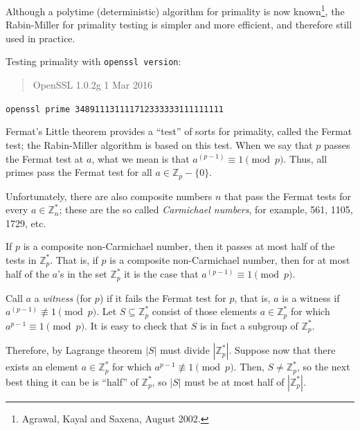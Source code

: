 \begin{frame}
Although a polytime (deterministic) algorithm for primality is now
known\footnote{Agrawal, Kayal and Saxena, August 2002.}, the
Rabin-Miller  
for primality testing is simpler and
more efficient, and therefore still used in practice.
\end{frame}

\begin{frame}
Testing primality with {\tt openssl version}: 
\begin{quote}
OpenSSL 1.0.2g  1 Mar 2016
\end{quote}

{\tt openssl prime 348911131111712333333111111111}
\end{frame}

\begin{frame}
Fermat's Little theorem
provides a ``test'' of sorts for primality,
called the Fermat test; the Rabin-Miller algorithm
is based on this test.  When we say
that $p$ passes the Fermat test at $a$, what we mean is that
$a^{(p-1)}\equiv 1\pmod p$.  Thus, all primes pass the Fermat test for
all $a\in\mathbb{Z}_p-\{0\}$.  

Unfortunately, there are also composite numbers $n$ that pass the
Fermat tests for every $a\in\mathbb{Z}_n^*$; these are the so called
{\em Carmichael numbers}, for example, 561, 1105, 1729, etc.
\end{frame}

\begin{frame}
If $p$ is a composite non-Carmichael number, then it passes at most
half of the tests in $\mathbb{Z}_p^*$.  That is, if $p$ is a composite
non-Carmichael number, then for at most half of the $a$'s in the set
$\mathbb{Z}_p^*$ it is the case that $a^{(p-1)}\equiv 1\pmod p$.

Call $a$ a {\em witness} (for $p$) if it fails the Fermat test for
$p$, that is, $a$ is a witness if $a^{(p-1)}\not\equiv 1\pmod p$.  Let
$S\subseteq\mathbb{Z}_p^*$ consist of those elements
$a\in\mathbb{Z}_p^*$ for which $a^{p-1}\equiv 1\pmod p$.  It is easy
to check that $S$ is in fact a subgroup of $\mathbb{Z}_p^*$.

Therefore, by Lagrange theorem
$|S|$ must divide $|\mathbb{Z}_p^*|$.  Suppose now that there exists
an element $a\in\mathbb{Z}_p^*$ for which $a^{p-1}\not\equiv 1\pmod
p$.  Then, $S\neq\mathbb{Z}_p^*$, so
the next best thing it can be is ``half'' of $\mathbb{Z}_p^*$, so
$|S|$ must be at most half of $|\mathbb{Z}_p^*|$.  
\end{frame}

